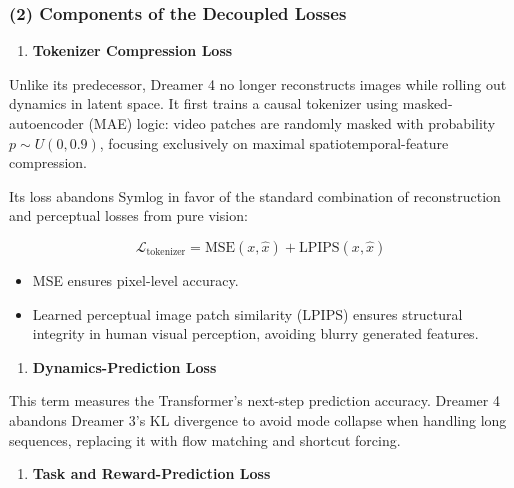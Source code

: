 \hypertarget{components-of-the-decoupled-losses}{%
\subsubsection{(2) Components of the Decoupled Losses}\label{components-of-the-decoupled-losses}}

\begin{enumerate}
\def\labelenumi{\arabic{enumi}.}
\tightlist
\item
  \textbf{Tokenizer Compression Loss}
\end{enumerate}

Unlike its predecessor, Dreamer 4 no longer reconstructs images while rolling out dynamics in latent space. It first trains a causal tokenizer using masked-autoencoder (MAE) logic: video patches are randomly masked with probability \(p \sim U(0, 0.9)\), focusing exclusively on maximal spatiotemporal-feature compression.

Its loss abandons Symlog in favor of the standard combination of reconstruction and perceptual losses from pure vision:

\[
\mathcal{L}_{\mathrm{tokenizer}}=\mathrm{MSE}(x, \hat{x})+\mathrm{LPIPS}(x, \hat{x})
\]

\begin{itemize}
\tightlist
\item
  MSE ensures pixel-level accuracy.
\item
  Learned perceptual image patch similarity (LPIPS) ensures structural integrity in human visual perception, avoiding blurry generated features.
\end{itemize}

\begin{enumerate}
\def\labelenumi{\arabic{enumi}.}
\setcounter{enumi}{1}
\tightlist
\item
  \textbf{Dynamics-Prediction Loss}
\end{enumerate}

This term measures the Transformer's next-step prediction accuracy. Dreamer 4 abandons Dreamer 3's KL divergence to avoid mode collapse when handling long sequences, replacing it with flow matching and shortcut forcing.

\begin{enumerate}
\def\labelenumi{\arabic{enumi}.}
\setcounter{enumi}{2}
\tightlist
\item
  \textbf{Task and Reward-Prediction Loss}
\end{enumerate}

